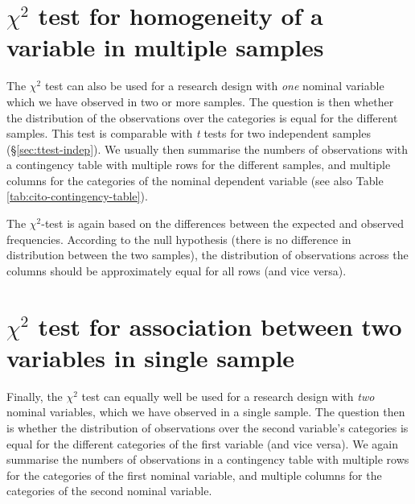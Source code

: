 \documentclass[
]{book}
\begin{document}
\hypertarget{chi2-test-for-homogeneity-of-a-variable-in-multiple-samples}{%
\section{\texorpdfstring{\(\chi^2\) test for homogeneity of a variable in multiple samples}{\textbackslash chi\^{}2 test for homogeneity of a variable in multiple samples}}\label{chi2-test-for-homogeneity-of-a-variable-in-multiple-samples}}

The \(\chi^2\) test can also be used for a research design with \emph{one} nominal
variable which we have observed in two or more samples. The
question is then whether the distribution of the observations over the
categories is equal for the different samples. This test is comparable with
\emph{t} tests for two independent samples
(§\ref{sec:ttest-indep}). We usually then summarise the numbers of observations
with a contingency table with multiple rows for the different samples,
and multiple columns for the categories of the nominal dependent variable (see also
Table \ref{tab:cito-contingency-table}).

The \(\chi^2\)-test is again based on the differences between the expected and
observed frequencies. According to the null hypothesis (there is no difference
in distribution between the two samples), the distribution of observations
across the columns should be approximately equal for all rows
(and vice versa).

\hypertarget{chi2-test-for-association-between-two-variables-in-single-sample}{%
\section{\texorpdfstring{\(\chi^2\) test for association between two variables in single sample}{\textbackslash chi\^{}2 test for association between two variables in single sample}}\label{chi2-test-for-association-between-two-variables-in-single-sample}}

Finally, the \(\chi^2\) test can equally well be used for a research design
with \emph{two} nominal variables, which we have observed in a single
sample. The question then is whether the distribution of observations
over the second variable's categories is equal for the different
categories of the first variable (and vice versa). We again summarise
the numbers of observations in a contingency table with multiple rows for
the categories of the first nominal variable, and multiple columns
for the categories of the second nominal variable.
\end{document}
